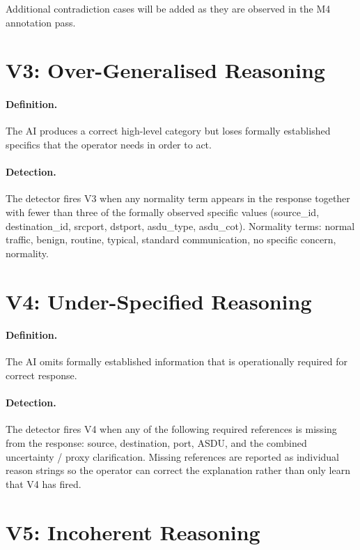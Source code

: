 Additional contradiction cases will be added as they are observed in the
M4 annotation pass.

\section{V3: Over-Generalised Reasoning}
\label{sec:appendix-v3}

\paragraph{Definition.}
The AI produces a correct high-level category but loses formally
established specifics that the operator needs in order to act.

\paragraph{Detection.}
The detector fires V3 when any normality term appears in the response
together with fewer than three of the formally observed specific values
(source\_id, destination\_id, srcport, dstport, asdu\_type, asdu\_cot).
Normality terms: normal traffic, benign, routine, typical, standard
communication, no specific concern, normality.

\section{V4: Under-Specified Reasoning}
\label{sec:appendix-v4}

\paragraph{Definition.}
The AI omits formally established information that is operationally
required for correct response.

\paragraph{Detection.}
The detector fires V4 when any of the following required references is
missing from the response: source, destination, port, ASDU, and the
combined uncertainty / proxy clarification. Missing references are
reported as individual reason strings so the operator can correct the
explanation rather than only learn that V4 has fired.

\section{V5: Incoherent Reasoning}
\label{sec:appendix-v5}


